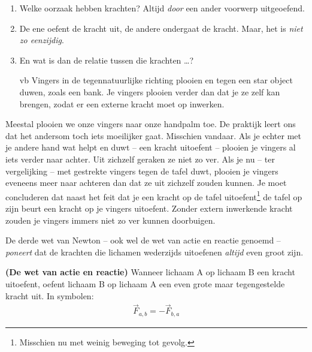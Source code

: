 \documentclass{ximera}
\begin{document}
	\author{Bart Lambregs}
    \xmsource\xmuitleg

\begin{enumerate}
\item Welke oorzaak hebben krachten? Altijd \emph{door} een ander voorwerp uitgeoefend. 
\item De ene oefent de kracht uit, de andere ondergaat de kracht. Maar, het is \emph{niet zo eenzijdig}.
\item En wat is dan de relatie tussen die krachten \ldots?
\item[vb] Vingers in de tegennatuurlijke richting plooien en tegen een star object duwen, zoals een bank. Je vingers plooien verder dan dat je ze zelf kan brengen, zodat er een externe kracht moet op inwerken.
\end{enumerate}	


	Meestal plooien we onze vingers naar onze handpalm toe. De praktijk leert ons dat het andersom toch iets moeilijker gaat. Misschien vandaar. Als je echter met je andere hand wat helpt en duwt -- een kracht uitoefent -- plooien je vingers al iets verder naar achter. Uit zichzelf geraken ze niet zo ver. Als je nu -- ter vergelijking -- met gestrekte vingers tegen de tafel duwt, plooien je vingers eveneens meer naar achteren dan dat ze uit zichzelf zouden kunnen. Je moet concluderen dat naast het feit dat je een kracht op de tafel uitoefent\footnote{Misschien nu met weinig beweging tot gevolg.} de tafel op zijn beurt een kracht op je vingers uitoefent. Zonder extern inwerkende kracht zouden je vingers immers niet zo ver kunnen doorbuigen.

	
	De derde wet van Newton -- ook wel de wet van actie en reactie genoemd -- \textit{poneert} dat de krachten die lichamen wederzijds uitoefenen \textit{altijd} even groot zijn.
	\begin{definition}
	{\textbf{(De wet van actie en reactie)}}
	Wanneer lichaam A op lichaam B een kracht uitoefent, oefent lichaam B op lichaam A een even grote maar tegengestelde kracht uit. In symbolen:
	\begin{eqnarray*}
	\vec{F}_{a,b}=-\vec{F}_{b,a}
	\end{eqnarray*}
	\end{definition}
\end{document}
